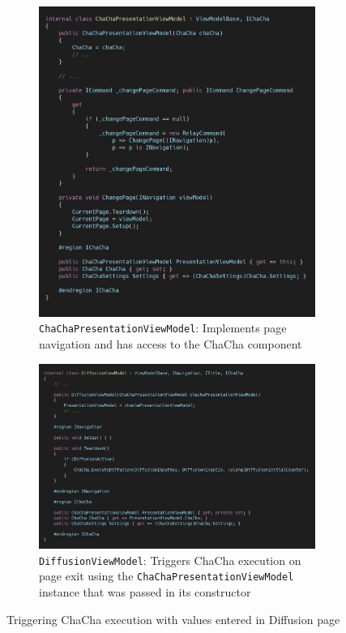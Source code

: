 \begin{figure}
\centering
\begin{subfigure}[t]{0.5\textwidth}
\centering
\includegraphics[width=0.99\textwidth]{figures/code/mvvm-arch/chachaPresentationViewModel.png}
\caption{\texttt{ChaChaPresentationViewModel}: Implements page navigation and has access to the ChaCha component}\label{fig:mvvm.chachapresentationviewmodel}
\end{subfigure}%
\begin{subfigure}[t]{0.5\textwidth}
\centering
\includegraphics[width=0.99\textwidth]{figures/code/mvvm-arch/diffusionViewModel.png}
\caption{\texttt{DiffusionViewModel}: Triggers ChaCha execution on page exit using the \texttt{ChaChaPresentationViewModel} instance that was passed in its constructor}
 \label{fig:mvvm.viewmodelbase}
\end{subfigure}
\caption[ChaCha diffusion execution]{Triggering ChaCha execution with values entered in Diffusion page}
\label{fig:mvvm.chachatrigger}
\end{figure}

